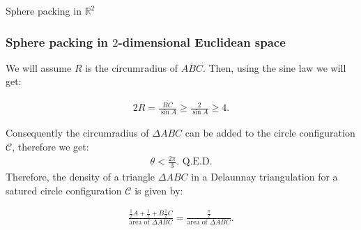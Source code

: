 \documentclass[10pt]{beamer}
\begin{document}
\begin{frame}{Sphere packing in $\mathbb{R}^2$}
    \frametitle{Sphere packing in $2$-dimensional Euclidean space}
    
    \begin{block}{}
    
 We will assume $R$ is the circumradius of $\overline{ABC}$. Then, using the sine law we will get: 
    
    \begin{equation} \label{5}
    \begin{split}
        2 R = \frac{\overline{BC}}{\sin A} \geq \frac{2}{\sin A} \geq 4. 
    \end{split}
    \end{equation}
    
    Consequently the circumradius of $\Delta ABC$ can be added to the circle configuration $\mathcal{C}$, therefore we get: 
    \begin{equation} \label{6}
    \begin{split}
        \theta < \frac{2 \pi}{3}. \text{ Q.E.D.}
    \end{split}
    \end{equation}
    Therefore, the density of a triangle $\Delta ABC$ in a Delaunnay triangulation for a satured circle configuration $\mathcal{C}$ is given by:
    
    \begin{equation} \label{6.1}
    \begin{split}
        \frac{\frac{1}{2} A + \frac{1}{2} + B \frac{1}{2} C}{\text{area of } \Delta ABC} = \frac{\frac{\pi}{2}}{\text{area of } \Delta ABC}.
    \end{split}
    \end{equation}
    
    \end{block}
\end{frame}
\end{document}
